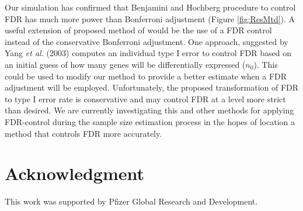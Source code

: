 \documentclass{bioinfo}
\begin{document}
Our simulation has confirmed that Benjamini and Hochberg procedure to
control FDR has much more power than Bonferroni adjustment (Figure
\ref{fig:ResMtd}). A useful extension of proposed method of would be
the use of a FDR control instead of the conservative Bonferroni
adjustment. One approach, suggested by Yang \textit{et al.} (2003)
computes an individual type I error to control FDR based on an
initial guess of how many genes will be differentially expressed
($n_0$). This could be used to modify our method to provide a better
estimate when a FDR adjustment will be employed.  Unfortunately, the
proposed transformation of FDR to type I error rate is conservative
and may control FDR at a level more strict than desired. We are
currently investigating this and other methods for applying
FDR-control during the sample size estimation process in the hopes
of location a method that controls FDR more accurately.


\section*{Acknowledgment}

This work was supported by Pfizer Global Research and Development.
\end{document}
